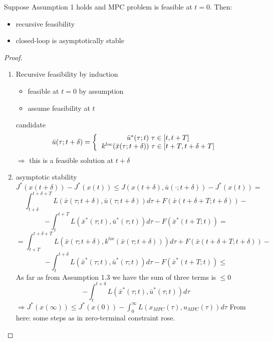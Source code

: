 \begin{Theorem}

Suppose Assumption 1 holds and MPC problem is feasible at $t=0$. Then:
\begin{itemize}
\item recursive feasibility
\item closed-loop is asymptotically stable
\end{itemize}

\begin{proof}
\begin{enumerate}
\item Recursive feasibility by induction 
\begin{itemize}
\item feasible at $t=0$ by assumption
\item assume feasibility at $t$
\end{itemize}
candidate 
\begin{equation*}
\bar u(\tau; t+\delta) =
\left \{
  \begin{tabular}{c}
  $\bar u^*(\tau;t) \ \tau \in [t, t+ T]$ \\
  $k^{loc}(\bar x(\tau;t+\delta)) \ \tau \in [t+T, t+\delta+T]$ 
  \end{tabular}
  \right.
\end{equation*}
$\Rightarrow$ this is a feasible solution at $t+\delta$
\item asymptotic stability
\begin{equation*}
J^*(x(t+\delta)) - J^*(x(t)) \leq J(x(t+\delta), \bar u(\cdot;t+\delta)) - J^*(x(t)) =
\end{equation*}
\begin{equation*}
\int_{t+\delta}^{t+ \delta +T} L(\bar x(\tau;t+\delta), \bar u(\tau;t+\delta)) d\tau + F(\bar x(t+\delta+ T;t+\delta)) -
\end{equation*}
\begin{equation*}
- \int_{t}^{t+T}L(\bar x^*(\tau;t),\bar u^*(\tau;t))d\tau - F(\bar x^*(t+T;t)) =
\end{equation*}
\begin{equation*}
= \int_{t+T}^{t+\delta+T}L(\bar x(\tau;t+\delta), k^{loc}(\bar x(\tau;t+\delta)))d\tau + F(\bar x(t+\delta+T;t+\delta)) -
\end{equation*}
\begin{equation*}
- \int_t^{t+\delta}L(\bar x^*(\tau;t), \bar u^*(\tau;t))d\tau - F(\bar x^*(t+T;t)) \leq
\end{equation*}
As far as from Assumption 1.3 we have the sum of three terms is $\leq 0$
\begin{equation*}
-\int_t^{t+\delta}L(\bar x^*(\tau;t),\bar u^*(\tau;t))d\tau
\end{equation*}
$\Rightarrow J^*(x(\infty)) \leq J^*(x(0)) - \int_0^{\infty}L(x_{MPC}(\tau), u_{MPC}(\tau))d\tau$
From here: some steps as in zero-terminal constraint rose. 
\end{enumerate}
\end{proof}
\end{Theorem}

